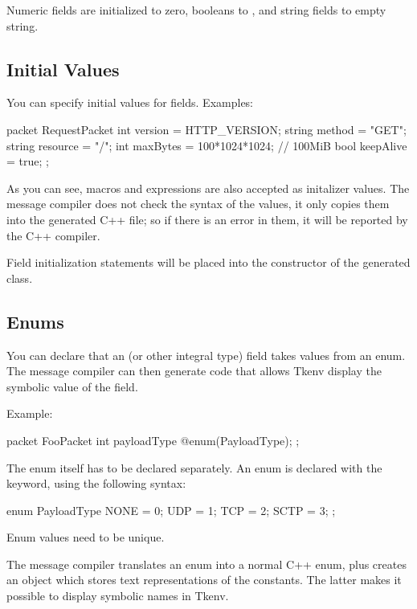 Numeric fields are initialized to zero, booleans to , and string
fields to empty string.


\subsection{Initial Values}
\label{sec:ch-msg-defs:initial-values}

You can specify initial values for fields. Examples:

\begin{msg}
packet RequestPacket
{
    int version = HTTP_VERSION;
    string method = "GET";
    string resource = "/";
    int maxBytes = 100*1024*1024; // 100MiB
    bool keepAlive = true;
};
\end{msg}

As you can see, macros and expressions are also accepted as initalizer
values. The message compiler does not check the syntax of the values, it
only copies them into the generated C++ file; so if there is an error in
them, it will be reported by the C++ compiler.

Field initialization statements will be placed into the constructor of the
generated class.


\subsection{Enums}
\label{sec:ch-msg-defs:enums}

You can declare that an  (or other integral type) field
takes values from an enum. The message compiler can then generate code
that allows Tkenv display the symbolic value of the field.

Example:

\begin{msg}
packet FooPacket
{
    int payloadType @enum(PayloadType);
};
\end{msg}

The enum itself has to be declared separately. An enum is declared with
the  keyword, using the following syntax:

\begin{msg}
enum PayloadType
{
   NONE = 0;
   UDP = 1;
   TCP = 2;
   SCTP = 3;
};
\end{msg}

Enum values need to be unique.

The message compiler translates an enum into a normal C++ enum, plus
creates an object which stores text representations of the constants. The
latter makes it possible to display symbolic names in Tkenv.

